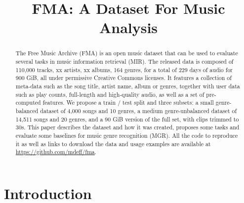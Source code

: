 \documentclass{article}
\title{FMA: A Dataset For Music Analysis}
\begin{document}
\maketitle

\begin{abstract}

The Free Music Archive (FMA) is an open music dataset that can be used to evaluate several tasks in music information retrieval (MIR).
The released data is composed of 110,000 tracks, xx artists, xx albums, 164 genres, for a total of 229 days of audio for 900 GiB, all under permissive Creative Commons licenses.
It features a collection of meta-data such as the song title, artist name, album or genres, together with user data such as play counts, full-length and high-quality audio, as well as a set of pre-computed features. We propose a train / test split and three subsets: a small genre-balanced dataset of 4,000 songs and 10 genres, a medium genre-unbalanced dataset of 14,511 songs and 20 genres, and a 90 GiB version of the full set, with clips trimmed to 30s.
This paper describes the dataset and how it was created, proposes some tasks and evaluate some baselines for music genre recognition (MGR).
All the code to reproduce it as well as links to download the data and usage examples are available at \url{https://github.com/mdeff/fma}.


\end{abstract}



\section{Introduction} %
\end{document}
